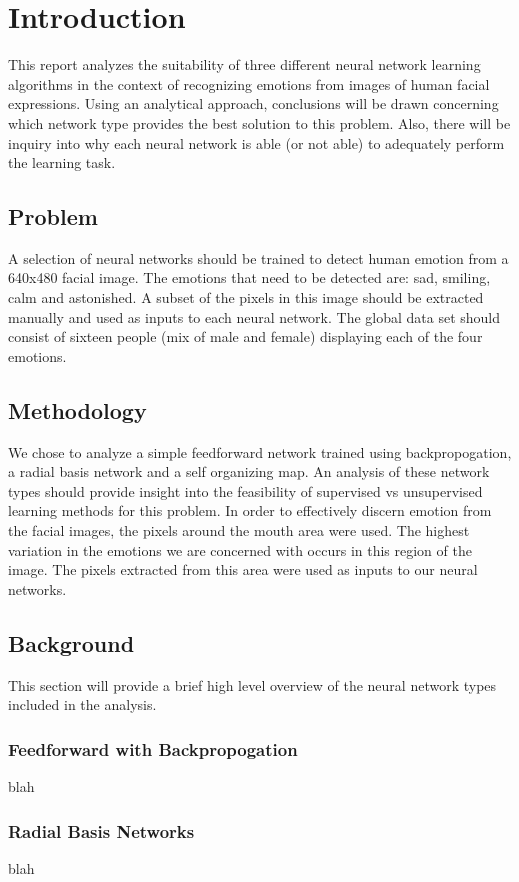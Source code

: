 \documentclass[ece]{uw-wkrpt}
\begin{document}
\section{Introduction}
This report analyzes the suitability of three different neural network learning algorithms in the context of recognizing emotions from images of human facial expressions. 
Using an analytical approach, conclusions will be drawn concerning which network type provides the best solution to this problem. Also, there will be inquiry into why each neural network is able (or not able) to  adequately perform the learning task. 

\subsection{Problem}
A selection of neural networks should be trained to detect human emotion from a 640x480 facial image. The emotions that need to be detected are: sad, smiling, calm and astonished.  A subset of the pixels in this image should be extracted manually and used as inputs to each neural network. The global data set should consist of sixteen people (mix of male and female) displaying each of the four emotions. 

\subsection{Methodology}
We chose to analyze a simple feedforward network trained using backpropogation, a radial basis network and  a self organizing map. An analysis of these network types should provide insight into the feasibility of supervised vs unsupervised learning methods for this problem. In order to effectively discern emotion from the facial images, the pixels around the mouth area were used. The highest variation in the emotions we are concerned with occurs in this region of the image. The pixels extracted from this area were used as inputs to our neural networks. 

\subsection{Background}
This section will provide a brief high level overview of the neural network types included in the analysis.
\subsubsection{ Feedforward with Backpropogation}
blah
\subsubsection{Radial Basis Networks}
blah
\end{document}
